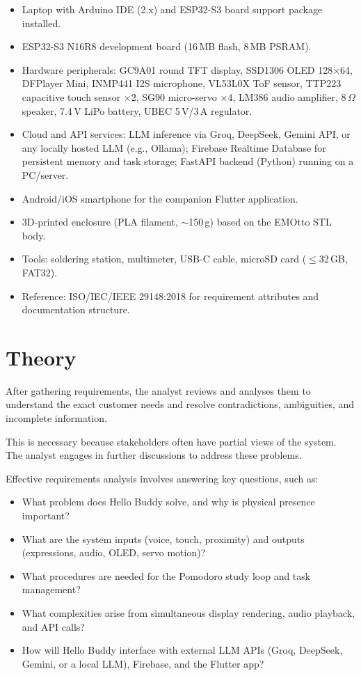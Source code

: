 \documentclass[12pt,a4paper]{article}
\begin{document}
\begin{itemize}[leftmargin=*]
\item Laptop with Arduino IDE (2.x) and ESP32-S3 board support package installed.
\item ESP32-S3 N16R8 development board (16\,MB flash, 8\,MB PSRAM).
\item Hardware peripherals: GC9A01 round TFT display, SSD1306 OLED
      128$\times$64, DFPlayer Mini, INMP441 I2S microphone, VL53L0X ToF
      sensor, TTP223 capacitive touch sensor $\times$2, SG90 micro-servo
      $\times$4, LM386 audio amplifier, 8\,$\Omega$ speaker, 7.4\,V LiPo
      battery, UBEC 5\,V/3\,A regulator.
\item Cloud and API services: LLM inference via Groq, DeepSeek, Gemini API,
      or any locally hosted LLM (e.g., Ollama); Firebase Realtime Database
      for persistent memory and task storage; FastAPI backend (Python)
      running on a PC/server.
\item Android/iOS smartphone for the companion Flutter application.
\item 3D-printed enclosure (PLA filament, $\sim$150\,g) based on the
      EMOtto STL body.
\item Tools: soldering station, multimeter, USB-C cable, microSD card
      ($\leq$32\,GB, FAT32).
\item Reference: ISO/IEC/IEEE 29148:2018 for requirement attributes and
      documentation structure.
\end{itemize}

\section*{Theory}

After gathering requirements, the analyst reviews and analyses them to understand the
exact customer needs and resolve contradictions, ambiguities, and incomplete information.

This is necessary because stakeholders often have partial views of the system.
The analyst engages in further discussions to address these problems.

Effective requirements analysis involves answering key questions, such as:

\begin{itemize}[leftmargin=*]
\item What problem does Hello Buddy solve, and why is physical presence
      important?
\item What are the system inputs (voice, touch, proximity) and outputs
      (expressions, audio, OLED, servo motion)?
\item What procedures are needed for the Pomodoro study loop and task
      management?
\item What complexities arise from simultaneous display rendering, audio
      playback, and API calls?
\item How will Hello Buddy interface with external LLM APIs (Groq,
      DeepSeek, Gemini, or a local LLM), Firebase, and the Flutter app?
\end{itemize}
\end{document}

